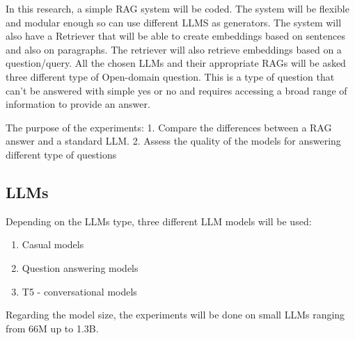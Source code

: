 \documentclass{wseas}
\begin{document}
In this research, a simple RAG system will be coded. The system will be
flexible and modular enough so can use different LLMS as generators. The
system will also have a Retriever that will be able to create embeddings
based on sentences and also on paragraphs. The retriever will also
retrieve embeddings based on a question/query. All the chosen LLMs and
their appropriate RAGs will be asked three different type of Open-domain
question. This is a type of question that can't be answered with simple
yes or no and requires accessing a broad range of information to provide
an answer.

The purpose of the experiments: 1. Compare the differences between a RAG
answer and a standard LLM. 2. Assess the quality of the models for
answering different type of questions

\subsection{LLMs}

Depending on the LLMs type, three different LLM models will be used:

\begin{enumerate}
\def\labelenumi{\arabic{enumi}.}
\item
  Casual models
\item
  Question answering models
\item
  T5 - conversational models
\end{enumerate}

Regarding the model size, the experiments will be done on small LLMs
ranging from 66M up to 1.3B.


\end{document}
